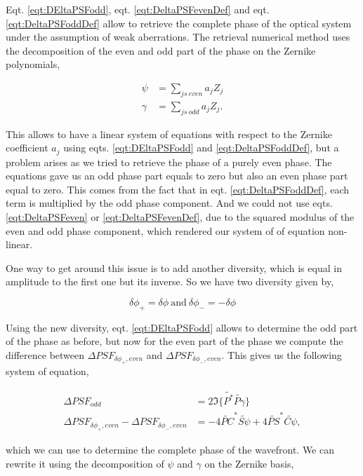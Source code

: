 Eqt. \eqref{eqt:DEltaPSFodd}, eqt. \eqref{eqt:DeltaPSFevenDef} and eqt. \eqref{eqt:DeltaPSFoddDef} allow to retrieve the complete phase of the optical system under the assumption of weak aberrations. The retrieval numerical method uses the decomposition of the even and odd part of the phase on the Zernike polynomials,

\begin{align}
\psi &= \sum\limits_{js\ even} a_j Z_j \label{eqt:evenPhaseDecomp}\\
\gamma &= \sum\limits_{js\ odd} a_j Z_j. \label{eqt:oddPhaseDecomp}
\end{align}

This allows to have a linear system of equations with respect to the Zernike coefficient $a_j$ using eqts. \eqref{eqt:DEltaPSFodd} and \eqref{eqt:DeltaPSFoddDef}, but a problem arises as we tried to retrieve the phase of a purely even phase. The equations gave us an odd phase part equals to zero but also an even phase part equal to zero. This comes from the fact that in eqt. \eqref{eqt:DeltaPSFoddDef}, each term is multiplied by the odd phase component. And we could not use eqts. \eqref{eqt:DeltaPSFeven} or \eqref{eqt:DeltaPSFevenDef}, due to the squared modulus of the even and odd phase component, which rendered our system of of equation non-linear.

One way to get around this issue is to add another diversity, which is equal in amplitude to the first one but its inverse. So we have two diversity given by,

\begin{equation}
\delta\phi_+ = \delta\phi \mathrm{\ and \ } \delta\phi_- = -\delta\phi
\label{eqt:diversities}
\end{equation}

Using the new diversity, eqt. \eqref{eqt:DEltaPSFodd} allows to determine the odd part of the phase as before, but now for the even part of the phase we compute the difference between $\Delta PSF_{\delta\phi_+,even}$ and $\Delta PSF_{\delta\phi_-,even}$. This gives us the following system of equation,

\begin{align}
\Delta PSF_{odd} &= 2\Im\lbrace \widetilde{P^*}\widetilde{P \gamma}\rbrace \\
\Delta PSF_{\delta\phi_+, even}-\Delta PSF_{\delta\phi_-, even} &= -4\widetilde{PC}^*\widetilde{S\psi} +4\widetilde{PS}^*\widetilde{C\psi},
\end{align}

which we can use to determine the complete phase of the wavefront. We can rewrite it using the decomposition of $\psi$ and $\gamma$ on the Zernike basis,

